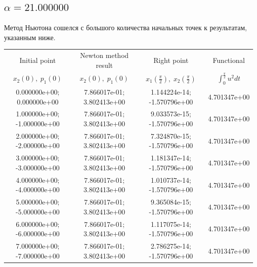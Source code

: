 \documentclass[titlepage]{article}
\def\l{\left}
\def\r{\right}
\begin{document}
\subsection{$\alpha = 21.000000$} 
Метод Ньютона сошелся с большого количества начальных точек к результатам, указанным ниже. \\ 
\begin{tabular}{ | c | c | c | c |} 
\hline 
Initial point  & Newton method result & Right point & Functional 
 \\ $x_2(0), \; p_1(0)$ & $x_2(0), \; p_1(0)$ & $x_1\l(\frac{\pi}{2}\r), \; x_2\l(\frac{\pi}{2}\r)$ & $\int_{0}^{\frac{\pi}{2}}u^2dt$  \\ \hline 
0.000000e+00; 0.000000e+00 & 7.866017e-01; 3.802413e+00 & 1.144224e-14; -1.570796e+00 & 4.701347e+00 \\ \hline 
1.000000e+00; -1.000000e+00 & 7.866017e-01; 3.802413e+00 & 9.033573e-15; -1.570796e+00 & 4.701347e+00 \\ \hline 
2.000000e+00; -2.000000e+00 & 7.866017e-01; 3.802413e+00 & 7.324870e-15; -1.570796e+00 & 4.701347e+00 \\ \hline 
3.000000e+00; -3.000000e+00 & 7.866017e-01; 3.802413e+00 & 1.181347e-14; -1.570796e+00 & 4.701347e+00 \\ \hline 
4.000000e+00; -4.000000e+00 & 7.866017e-01; 3.802413e+00 & 1.010737e-14; -1.570796e+00 & 4.701347e+00 \\ \hline 
5.000000e+00; -5.000000e+00 & 7.866017e-01; 3.802413e+00 & 9.365084e-15; -1.570796e+00 & 4.701347e+00 \\ \hline 
6.000000e+00; -6.000000e+00 & 7.866017e-01; 3.802413e+00 & 1.117075e-14; -1.570796e+00 & 4.701347e+00 \\ \hline 
7.000000e+00; -7.000000e+00 & 7.866017e-01; 3.802413e+00 & 2.786275e-14; -1.570796e+00 & 4.701347e+00 \\ \hline 
\end{tabular} 
\end{document}
